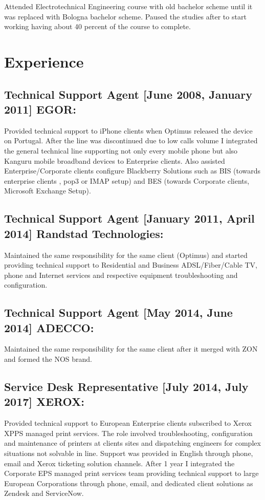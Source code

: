 \documentclass{article}
\begin{document}
Attended Electrotechnical Engineering course with old bachelor scheme until it was replaced with Bologna bachelor scheme. Paused the studies after to start working having about 40 percent of the course to complete.

\section{Experience}

\subsection{Technical Support Agent [June 2008, January 2011] EGOR:}

Provided technical support to iPhone clients when Optimus released the device on Portugal. After the line was discontinued due to low calls volume I integrated the general technical line supporting not only every mobile phone but also Kanguru mobile broadband devices to Enterprise clients. Also assisted Enterprise/Corporate clients configure Blackberry Solutions such as BIS (towards enterprise clients , pop3 or IMAP setup) and BES (towards Corporate clients, Microsoft Exchange Setup).

\subsection{Technical Support Agent [January 2011, April 2014] Randstad Technologies:}

Maintained the same responsibility for the same client (Optimus) and started providing technical support to Residential and Business ADSL/Fiber/Cable TV, phone and Internet services and respective equipment troubleshooting and configuration.

\subsection{Technical Support Agent [May 2014, June 2014] ADECCO:}

Maintained the same responsibility for the same client after it merged with ZON and formed the NOS brand.

\subsection{Service Desk Representative [July 2014, July 2017] XEROX:}

Provided technical support to European Enterprise clients subscribed to Xerox XPPS managed print services. The role involved troubleshooting, configuration and maintenance of printers at clients sites and dispatching engineers for complex situations not solvable in line. Support was provided in English through phone, email and Xerox ticketing solution channels. After 1 year I integrated the Corporate EPS managed print services team providing technical support to large European Corporations through phone, email, and dedicated client solutions as Zendesk and ServiceNow.
\end{document}
